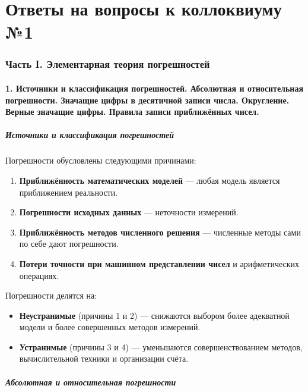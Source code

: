 \documentclass[14pt,a4paper]{extarticle}
\begin{document}
\part{Ответы на вопросы к коллоквиуму №1}

\section{Часть I. Элементарная теория погрешностей}

\subsection{1. Источники и классификация погрешностей. Абсолютная и относительная погрешности. Значащие цифры в десятичной записи числа. Округление. Верные значащие цифры. Правила записи приближённых чисел.}

\subsubsection{Источники и классификация погрешностей}

Погрешности обусловлены следующими причинами:

\begin{enumerate}
    \item \textbf{Приближённость математических моделей} --- любая модель является приближением реальности.
    \item \textbf{Погрешности исходных данных} --- неточности измерений.
    \item \textbf{Приближённость методов численного решения} --- численные методы сами по себе дают погрешности.
    \item \textbf{Потери точности при машинном представлении чисел} и арифметических операциях.
\end{enumerate}

Погрешности делятся на:
\begin{itemize}
    \item \textbf{Неустранимые} (причины 1 и 2) --- снижаются выбором более адекватной модели и более совершенных методов измерений.
    \item \textbf{Устранимые} (причины 3 и 4) --- уменьшаются совершенствованием методов, вычислительной техники и организации счёта.
\end{itemize}

\subsubsection{Абсолютная и относительная погрешности}
\end{document}
